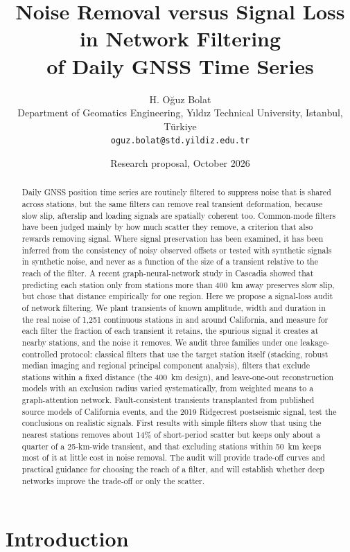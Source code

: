 \documentclass[11pt,a4paper]{article}
\title{Noise Removal versus Signal Loss in Network Filtering\\
of Daily GNSS Time Series}
\author{H. O\u{g}uz Bolat\\[2pt]
\small Department of Geomatics Engineering, Y{\i}ld{\i}z Technical University, Istanbul, T\"urkiye\\
\small \texttt{oguz.bolat@std.yildiz.edu.tr}}
\date{Research proposal, October 2026}
\begin{document}
\maketitle

\begin{abstract}
Daily GNSS position time series are routinely filtered to suppress noise that is shared across stations, but the same filters can remove real transient deformation, because slow slip, afterslip and loading signals are spatially coherent too. Common-mode filters have been judged mainly by how much scatter they remove, a criterion that also rewards removing signal. Where signal preservation has been examined, it has been inferred from the consistency of noisy observed offsets or tested with synthetic signals in synthetic noise, and never as a function of the size of a transient relative to the reach of the filter. A recent graph-neural-network study in Cascadia showed that predicting each station only from stations more than 400~km away preserves slow slip, but chose that distance empirically for one region. Here we propose a signal-loss audit of network filtering. We plant transients of known amplitude, width and duration in the real noise of 1,251 continuous stations in and around California, and measure for each filter the fraction of each transient it retains, the spurious signal it creates at nearby stations, and the noise it removes. We audit three families under one leakage-controlled protocol: classical filters that use the target station itself (stacking, robust median imaging and regional principal component analysis), filters that exclude stations within a fixed distance (the 400~km design), and leave-one-out reconstruction models with an exclusion radius varied systematically, from weighted means to a graph-attention network. Fault-consistent transients transplanted from published source models of California events, and the 2019 Ridgecrest postseismic signal, test the conclusions on realistic signals. First results with simple filters show that using the nearest stations removes about 14\% of short-period scatter but keeps only about a quarter of a 25-km-wide transient, and that excluding stations within 50~km keeps most of it at little cost in noise removal. The audit will provide trade-off curves and practical guidance for choosing the reach of a filter, and will establish whether deep networks improve the trade-off or only the scatter.
\end{abstract}

\section{Introduction}
\end{document}
